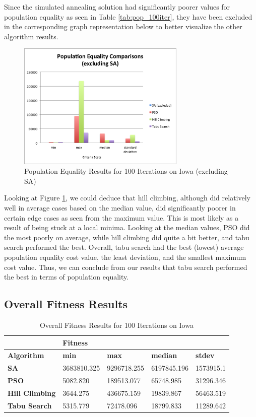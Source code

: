 \documentclass[journal]{IEEEtran}
\begin{document}
Since the simulated annealing solution had significantly poorer values for population equality as seen in Table \ref{tab:pop_100iter}, they have been excluded in the corresponding graph representation below to better visualize the other algorithm results.

\begin{figure}[h!]
    \includegraphics[width=8cm]{images/pop_equality_graph.png}
    \centering
    \caption{Population Equality Results for 100 Iterations on Iowa (excluding SA)}
    \label{fig:pop_results}
\end{figure}

Looking at Figure \ref{fig:pop_results}, we could deduce that hill climbing, although did relatively well in average cases based on the median value, did significantly poorer in certain edge cases as seen from the maximum value. This is most likely as a result of being stuck at a local minima. Looking at the median values, PSO did the most poorly on average, while hill climbing did quite a bit better, and tabu search performed the best. Overall, tabu search had the best (lowest) average population equality cost value, the least deviation, and the smallest maximum cost value. Thus, we can conclude from our results that tabu search performed the best in terms of population equality.

\subsection{Overall Fitness Results}

\begin{table}[!h]
\centering
\caption{Overall Fitness Results for 100 Iterations on Iowa}
\label{tab:fitness_100iter}
\begin{tabular}{l|llll}
                       & \multicolumn{4}{l}{\textbf{Fitness}}                          \\ \hline
\textbf{Algorithm}     & \textbf{min} & \textbf{max} & \textbf{median} & \textbf{stdev} \\ \hline
\textbf{SA}            & 3683810.325  & 9296718.255  & 6197845.196     & 1573915.1    \\
\textbf{PSO}           & 5082.820     & 189513.077   & 65748.985       & 31296.346      \\
\textbf{Hill Climbing} & 3644.275     & 436675.159   & 19839.867       & 56463.519      \\
\textbf{Tabu Search}   & 5315.779     & 72478.096    & 18799.833       & 11289.642
\end{tabular}
\end{table}
\end{document}
